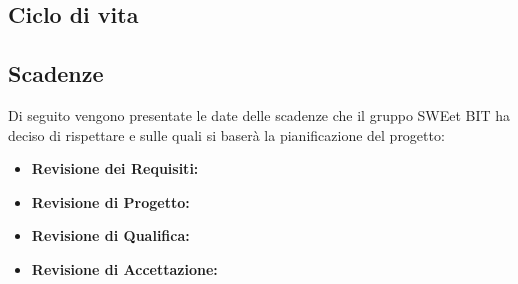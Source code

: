 \subsection{Ciclo di vita}
\subsection{Scadenze}
Di seguito vengono presentate le date delle scadenze che il gruppo SWEet BIT ha deciso di rispettare e sulle quali si baserà la pianificazione del progetto: \\
\begin{itemize}
	\item \textbf{Revisione dei Requisiti:}
	\item \textbf{Revisione di Progetto:}
	\item \textbf{Revisione di Qualifica:}
	\item \textbf{Revisione di Accettazione:}
\end{itemize}